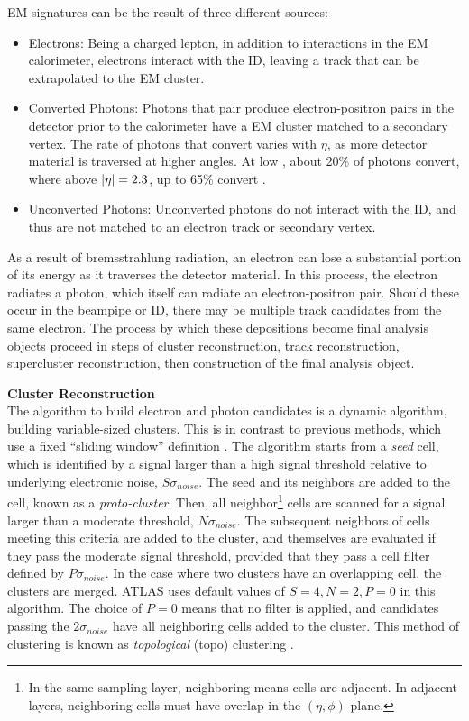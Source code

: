 \gls{EM} signatures can be the result of three different sources:
\begin{itemize}
    \item Electrons: Being a charged lepton, in addition to interactions in the \gls{EM} calorimeter, electrons interact with the \gls{ID}, leaving a track that can be extrapolated to the \gls{EM} cluster.
    \item Converted Photons: Photons that pair produce electron-positron pairs in the detector prior to the calorimeter have a \gls{EM} cluster matched to a secondary vertex. The rate of photons that convert varies with $\eta$, as more detector material is traversed at higher angles. At low \abseta, about 20\% of photons convert, where above $|\eta|=2.3$, up to 65\% convert \cite{photon-electron-perf}.
    \item Unconverted Photons: Unconverted photons do not interact with the \gls{ID}, and thus are not matched to an electron track or secondary vertex.
\end{itemize}

As a result of bremsstrahlung radiation, an electron can lose a substantial portion of its energy as it traverses the detector material. In this process, the electron radiates a photon, which itself can radiate an electron-positron pair. Should these occur in the beampipe or \gls{ID}, there may be multiple track candidates from the same electron. The process by which these depositions become final analysis objects proceed in steps of cluster reconstruction, track reconstruction, supercluster reconstruction, then construction of the final analysis object.


\noindent\textbf{Cluster Reconstruction}\\
\indent The algorithm to build electron and photon candidates is a dynamic algorithm, building variable-sized clusters. This is in contrast to previous methods, which use a fixed ``sliding window'' definition \cite{sliding-window}. The algorithm starts from a \textit{seed} cell, which is identified by a signal larger than a high signal threshold relative to underlying electronic noise, $S\sigma_{noise}$. The seed and its neighbors are added to the cell, known as a \textit{proto-cluster}. Then, all neighbor\footnote{In the same sampling layer, neighboring means cells are adjacent. In adjacent layers, neighboring cells must have overlap in the $(\eta,\phi)$ plane.} cells are scanned for a signal larger than a moderate threshold, $N\sigma_{noise}$. The subsequent neighbors of cells meeting this criteria are added to the cluster, and themselves are evaluated if they pass the moderate signal threshold, provided that they pass a cell filter defined by $P\sigma_{noise}$. In the case where two clusters have an overlapping cell, the clusters are merged. ATLAS uses default values of $S=4,N=2,P=0$ in this algorithm. The choice of $P=0$ means that no filter is applied, and candidates passing the $2\sigma_{noise}$ have all neighboring cells added to the cluster. This method of clustering is known as  \textit{topological} (topo) clustering \cite{topo-cluster}. 

